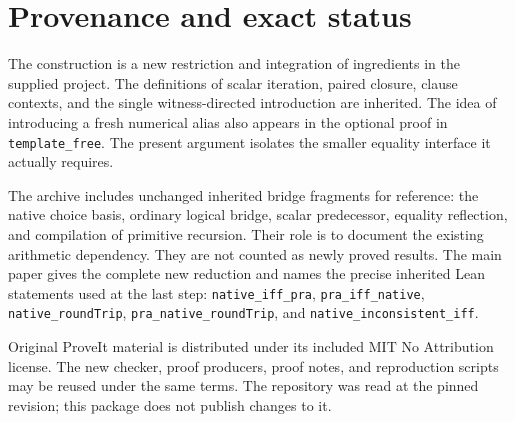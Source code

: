 \documentclass[11pt,letterpaper]{article}
\begin{document}
\section{Provenance and exact status}

The construction is a new restriction and integration of ingredients in
the supplied project. The definitions of scalar iteration, paired
closure, clause contexts, and the single witness-directed introduction
are inherited. The idea of introducing a fresh numerical alias also
appears in the optional proof in \texttt{template\_free}. The present
argument isolates the smaller equality interface it actually requires.

The archive includes unchanged inherited bridge fragments for reference:
the native choice basis, ordinary logical bridge, scalar predecessor,
equality reflection, and compilation of primitive recursion. Their role
is to document the existing arithmetic dependency. They are not counted
as newly proved results. The main paper gives the complete new reduction
and names the precise inherited Lean statements used at the last step:
\texttt{native\_iff\_pra}, \texttt{pra\_iff\_native},
\texttt{native\_roundTrip}, \texttt{pra\_native\_roundTrip}, and
\texttt{native\_inconsistent\_iff}.

Original ProveIt material is distributed under its included MIT No
Attribution license. The new checker, proof producers, proof notes, and
reproduction scripts may be reused under the same terms. The repository
was read at the pinned revision; this package does not publish changes
to it.
\end{document}
